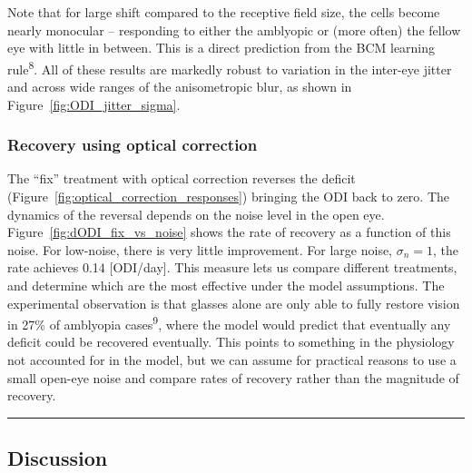 \documentclass[
]{article}
\begin{document}
Note that for large shift compared to the receptive field size, the
cells become nearly monocular -- responding to either the amblyopic or
(more often) the fellow eye with little in between. This is a direct
prediction from the BCM learning rule\textsuperscript{8}. All of these
results are markedly robust to variation in the inter-eye jitter and
across wide ranges of the anisometropic blur, as shown in
Figure~\ref{fig:ODI_jitter_sigma}.

\subsubsection{Recovery using optical
correction}\label{sec:recovery-using-optical-correction}

The ``fix'' treatment with optical correction reverses the deficit
(Figure~\ref{fig:optical_correction_responses}) bringing the ODI back to
zero. The dynamics of the reversal depends on the noise level in the
open eye. Figure~\ref{fig:dODI_fix_vs_noise} shows the rate of recovery
as a function of this noise. For low-noise, there is very little
improvement. For large noise, \(\sigma_n=1\), the rate achieves 0.14
{[}ODI/day{]}. This measure lets us compare different treatments, and
determine which are the most effective under the model assumptions. The
experimental observation is that glasses alone are only able to fully
restore vision in 27\% of amblyopia cases\textsuperscript{9}, where the
model would predict that eventually any deficit could be recovered
eventually. This points to something in the physiology not accounted for
in the model, but we can assume for practical reasons to use a small
open-eye noise and compare rates of recovery rather than the magnitude
of recovery.

\begin{center}\rule{0.5\linewidth}{0.5pt}\end{center}

\subsection{Discussion}\label{sec:discussion}
\end{document}
